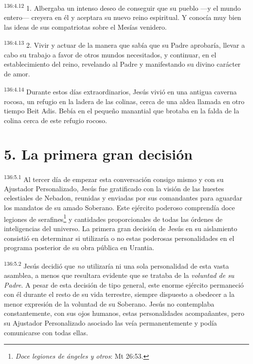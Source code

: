 \par
\textsuperscript{136:4.12} 1. Albergaba un intenso deseo de conseguir que su pueblo ---y el mundo entero--- creyera en él y aceptara su nuevo reino espiritual. Y conocía muy bien las ideas de sus compatriotas sobre el Mesías venidero.

\par
\textsuperscript{136:4.13} 2. Vivir y actuar de la manera que sabía que su Padre aprobaría, llevar a cabo su trabajo a favor de otros mundos necesitados, y continuar, en el establecimiento del reino, revelando al Padre y manifestando su divino carácter de amor.

\par
\textsuperscript{136:4.14} Durante estos días extraordinarios, Jesús vivió en una antigua caverna rocosa, un refugio en la ladera de las colinas, cerca de una aldea llamada en otro tiempo Beit Adis. Bebía en el pequeño manantial que brotaba en la falda de la colina cerca de este refugio rocoso.

\section*{5. La primera gran decisión}
\par
\textsuperscript{136:5.1} Al tercer día de empezar esta conversación consigo mismo y con su Ajustador Personalizado, Jesús fue gratificado con la visión de las huestes celestiales de Nebadon, reunidas y enviadas por sus comandantes para aguardar los mandatos de su amado Soberano. Este ejército poderoso comprendía doce legiones de serafines\footnote{\textit{Doce legiones de ángeles y otros}: Mt 26:53.} y cantidades proporcionales de todas las órdenes de inteligencias del universo. La primera gran decisión de Jesús en su aislamiento consistió en determinar si utilizaría o no estas poderosas personalidades en el programa posterior de su obra pública en Urantia.

\par
\textsuperscript{136:5.2} Jesús decidió que \textit{no} utilizaría ni una sola personalidad de esta vasta asamblea, a menos que resultara evidente que se trataba de la \textit{voluntad de su Padre}. A pesar de esta decisión de tipo general, este enorme ejército permaneció con él durante el resto de su vida terrestre, siempre dispuesto a obedecer a la menor expresión de la voluntad de su Soberano. Jesús no contemplaba constantemente, con sus ojos humanos, estas personalidades acompañantes, pero su Ajustador Personalizado asociado las veía permanentemente y podía comunicarse con todas ellas.

